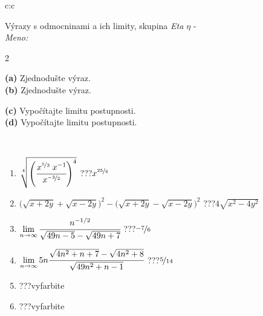 \documentclass[10pt]{report}
\begin{document}
\begin{tabular}{c:c}
\begin{minipage}[c][104.5mm][t]{0.5\linewidth}
\begin{center}
\vspace{7mm}
{\huge {\Large Výrazy s odmocninami a ich limity}, skupina \textit{Eta $\eta$} -}\\[5mm]
\textit{Meno:}\phantom{xxxxxxxxxxxxxxxxxxxxxxxxxxxxxxxxxxxxxxxxxxxxxxxxxxxxxxxxxxxxxxxxx}\\[5mm]
\begin{minipage}{0.95\linewidth}
\begin{center}
{\small \begin{multicols}{2} \raggedright
\phantom{xxxxxxxxx}\textbf{(a)} Zjednodušte výraz. \\[1mm]
\phantom{xxxxxxxxx}\textbf{(b)} Zjednodušte výraz. \par \columnbreak
\textbf{(c)} Vypočítajte limitu postupnosti. \\[1mm]
\textbf{(d)} Vypočítajte limitu postupnosti.
\end{multicols}
}
\end{center}
\end{minipage}
\\[4mm]
\begin{minipage}{0.79\linewidth}
\begin{center}
\begin{varwidth}{\linewidth}
\begin{enumerate}
\small
\item $\sqrt[4]{\left(\cfrac{x^{\nicefrac{5}{3}}\;x^{-1}}{x^{\nicefrac{-3}{2}}}\right)^{4}}$\quad \dotfill\; ???\;\dotfill \quad $x^{\nicefrac{25}{6}}$
\item {\footnotesize{\scriptsize$\big(\sqrt{x+2y}+\sqrt{x-2y}\big)^2-\big(\sqrt{x+2y}-\sqrt{x-2y}\big)^2$}\quad \dotfill\; ???\;\dotfill \quad $4\sqrt{x^2-4y^2}$}
\item $\lim\limits_{n\to\infty}\cfrac{n^{-1/2}}{\sqrt{49n-5}-\sqrt{49n+7}}$\quad \dotfill\; ???\;\dotfill \quad $\nicefrac{-7}{6}$
\item $\lim\limits_{n\to\infty}5n\cfrac{\sqrt{4n^2+n+7}-\sqrt{4n^2+8}}{\sqrt{49n^2+n-1}}$\quad \dotfill\; ???\;\dotfill \quad $\nicefrac{5}{14}$
\item \quad \dotfill\; ???\;\dotfill \quad vyfarbite
\item \quad \dotfill\; ???\;\dotfill \quad vyfarbite
\end{enumerate}
\end{varwidth}

\end{center}
\end{minipage}
\end{center}
\end{minipage}
\end{tabular}
\end{document}
